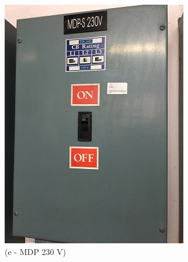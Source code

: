 \begin{figure}
	\begin{minipage}[b]{0.22\linewidth}
		\includegraphics[width=\textwidth]{figures/asv_visual_mdp230v}
		\caption*{(e - MDP 230 V)}
	\end{minipage}
	\hspace{0.03cm}
	\begin{minipage}[b]{0.22\linewidth}

\end{minipage}
\end{figure}
